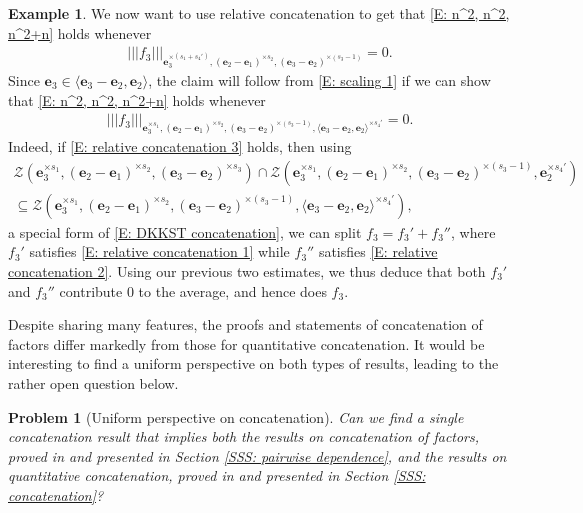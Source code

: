 \documentclass[11pt]{amsart}
\newtheorem{problem}{Problem}
\theoremstyle{definition}
\newtheorem{example}[lemma]{Example}
\newcommand{\CZ}{{\mathcal Z}}
\newcommand{\be}{{\mathbf{e}}}
\newcommand{\nnorm}[1]{\lvert\!|\!| #1|\!|\!\rvert}
\newcommand{\1}{{\mathbf{1}}}
\begin{document}
\begin{example}
    We now want to use relative concatenation to get that \eqref{E: n^2, n^2, n^2+n} holds whenever
    \begin{align*}%
        \nnorm{f_3}_{\be_3^{\times (s_1+s_4')}, (\be_2-\be_1)^{\times s_2}, (\be_3-\be_2)^{\times (s_3-1)}} = 0.
    \end{align*}
    Since $\be_3 \in \langle \be_3-\be_2, \be_2\rangle$, the claim will follow from \eqref{E: scaling 1} if we can show that \eqref{E: n^2, n^2, n^2+n} holds whenever 
    \begin{align}\label{E: relative concatenation 3}
        \nnorm{f_3}_{\be_3^{\times s_1}, (\be_2-\be_1)^{\times s_2}, (\be_3-\be_2)^{\times (s_3-1)}, \langle \be_3 -\be_2, \be_2 \rangle^{\times s_4'}} = 0.
    \end{align}
    Indeed, if \eqref{E: relative concatenation 3} holds, then using 
    \begin{multline*}
        \CZ(\be_3^{\times s_1}, (\be_2-\be_1)^{\times s_2}, (\be_3-\be_2)^{\times s_3})\cap\CZ(\be_3^{\times s_1}, (\be_2-\be_1)^{\times s_2}, (\be_3-\be_2)^{\times (s_3-1)}, \be_2^{\times s_4'})\\
        \subseteq \CZ(\be_3^{\times s_1}, (\be_2-\be_1)^{\times s_2}, (\be_3-\be_2)^{\times (s_3-1)}, \langle \be_3 -\be_2, \be_2 \rangle^{\times s_4'}),
    \end{multline*}
    a special form of \eqref{E: DKKST concatenation}, we can split $f_3 = f_3'+f_3''$, where $f_3'$ satisfies \eqref{E: relative concatenation 1} while $f_3''$ satisfies \eqref{E: relative concatenation 2}. Using our previous two estimates, we thus deduce that both $f_3'$ and $f_3''$ contribute 0 to the average, and hence does $f_3$. 
\end{example}

Despite sharing many features, the proofs and statements of concatenation of factors differ markedly from those for quantitative concatenation. It would be interesting to find a uniform perspective on both types of results, leading to the rather open question below.
\begin{problem}[Uniform perspective on concatenation]
    Can we find a single concatenation result that implies both the results on concatenation of factors, proved in \cite{DKKST25, TZ16} and presented in Section \ref{SSS: pairwise dependence}, and the results on quantitative concatenation, proved in \cite{DKKST24, KKL24a, Kuc23,  Pel20, PP19} and presented in Section \ref{SSS: concatenation}?
\end{problem}
\end{document}

